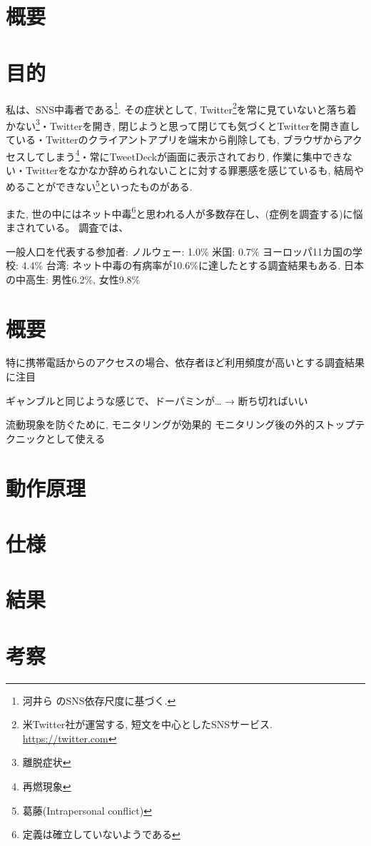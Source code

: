 \documentclass[10pt,a4paper\arg,uplatex,a4j,dvipdfmx]{jsarticle}
\begin{document}
    \section*{概要}


    \newpage

    \begin{multicols}{2}

    \section{目的}
    私は、SNS中毒者である\footnote{河井ら \cite{kawai2011sns} のSNS依存尺度に基づく.}.
    その症状として, Twitter\footnote{米Twitter社が運営する, 短文を中心としたSNSサービス. \url{https://twitter.com}}を常に見ていないと落ち着かない\footnote{離脱症状\cite{griffiths2005}}・Twitterを開き, 閉じようと思って閉じても気づくとTwitterを開き直している・Twitterのクライアントアプリを端末から削除しても, ブラウザからアクセスしてしまう\footnote{再燃現象\cite{griffiths2005}}・常にTweetDeckが画面に表示されており, 作業に集中できない・Twitterをなかなか辞められないことに対する罪悪感を感じているも, 結局やめることができない\footnote{葛藤(Intrapersonal conflict)\cite{griffiths2005}}といったものがある.
    
    また, 世の中にはネット中毒\footnote{定義は確立していないようである}と思われる人が多数存在し、(症例を調査する)に悩まされている。
    調査では、
    
    一般人口を代表する参加者:
      ノルウェー: 1.0\%
      米国: 0.7\%
    ヨーロッパ11カ国の学校: 4.4\%
    台湾: ネット中毒の有病率が10.6\%に達したとする調査結果もある\cite{wu2015risk}.
    日本の中高生: 男性6.2\%, 女性9.8\%
   
    \section{概要}
    
    特に携帯電話からのアクセスの場合、依存者ほど利用頻度が高いとする調査結果に注目
    
   ギャンブルと同じような感じで、ドーパミンが… → 断ち切ればいい
   
   流動現象を防ぐために, モニタリングが効果的\cite{internetaddiction}
   モニタリング後の外的ストップテクニックとして使える\cite{internetaddiction}

    \section{動作原理}

    \section{仕様}

    \section{結果}

    \section{考察}

    \end{multicols}


  \printbibliography[title=参考文献]
\end{document}
